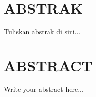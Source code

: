 \chapter*{ABSTRAK}

Tuliskan abstrak di sini...

\newpage

\chapter*{ABSTRACT}

Write your abstract here...
